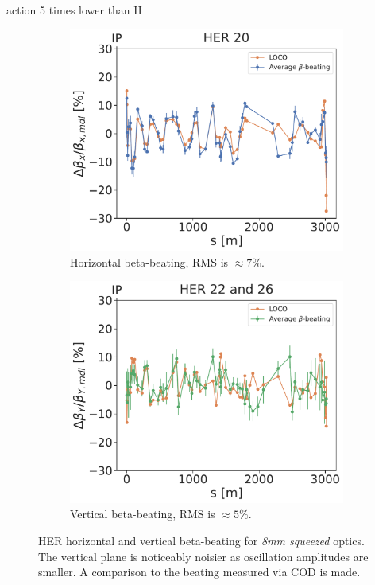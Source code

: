 action 5 times lower than H

\begin{figure}[!htb]
    \centering
    \begin{subfigure}[b]{0.48\textwidth}
        \includegraphics[width=\linewidth]{images/kek/her_20_bet_x_unzoomed.pdf}
        \caption{Horizontal beta-beating, RMS is $\approx 7\%$.}
    \end{subfigure}
    \hfill
    \begin{subfigure}[b]{0.48\textwidth}
        \includegraphics[width=\linewidth]{images/kek/her_22_26_bet_y_unzoomed.pdf}
        \caption{Vertical beta-beating, RMS is $\approx 5\%$.}
    \end{subfigure}
    \caption{HER horizontal and vertical beta-beating for \textit{8mm squeezed} optics. The vertical
    plane is noticeably noisier as oscillation amplitudes are smaller. A comparison to the beating
    measured via COD is made.}
    \label{fig:kek:beating_her_squeezed}
\end{figure}


